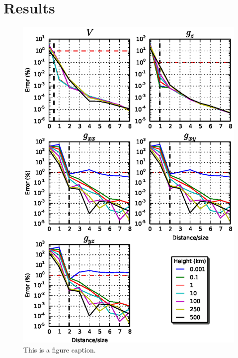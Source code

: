 \documentclass[paper,twocolumn,twoside]{geophysics}
\begin{document}
\section{Results}



\begin{figure}
    \centering
    \includegraphics[width=\columnwidth]{figs/error-20deg}
    \caption{This is a figure caption.}
    \label{fig:error20}
\end{figure}
\end{document}
